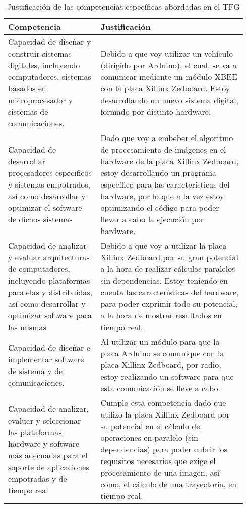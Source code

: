 \documentclass{pre-tfg}
\begin{document}


\begin{table}[hp]
  \centering
  \caption{Justificación de las competencias específicas abordadas en el TFG}
  \label{tab:competencias}

  \begin{tabular}{p{0.36\linewidth}p{0.58\linewidth}}
    \textbf{Competencia} & \textbf{Justificación} \\
    \hline
    Capacidad de diseñar y construir sistemas digitales, incluyendo computadores, sistemas basados en microprocesador y sistemas de comunicaciones. & Debido a que voy utilizar un vehículo (dirigido por Arduino), el cual, se va a comunicar mediante un módulo XBEE con la placa Xillinx Zedboard. Estoy desarrollando un nuevo sistema digital, formado por distinto hardware. \\
    Capacidad de desarrollar procesadores específicos y sistemas empotrados, así como desarrollar y optimizar el software de dichos sistemas & Dado que voy a embeber el algoritmo de procesamiento de imágenes en el hardware de la placa Xillinx Zedboard, estoy desarrollando un programa específico para las características del hardware, por lo que a la vez estoy optimizando el código para poder llevar a cabo la ejecución por hardware.\\
    Capacidad de analizar y evaluar arquitecturas de computadores, incluyendo plataformas paralelas y distribuidas, así como desarrollar y optimizar software para las mismas & Debido a que voy a utilizar la placa Xillinx Zedboard por su gran potencial a la hora de realizar cálculos paralelos sin dependencias. Estoy teniendo en cuenta las características del hardware, para poder exprimir todo su potencial, a la hora de mostrar resultados en tiempo real.\\
    Capacidad de diseñar e implementar software de sistema y de comunicaciones. & Al utilizar un módulo para que la placa Arduino se comunique con la placa Xillinx Zedboard, por radio, estoy realizando un software para que esta comunicación se lleve a cabo.\\
    Capacidad de analizar, evaluar y seleccionar las plataformas hardware y software más adecuadas para el soporte de aplicaciones empotradas y de tiempo real & Cumplo esta competencia dado que utilizo la placa Xillinx Zedboard por su potencial en el cálculo de operaciones en paralelo (sin dependencias) para poder cubrir los requisitos necesarios que exige el procesamiento de una imagen, así como, el cálculo de una trayectoria, en tiempo real.\\

\end{tabular}
\end{table}
\end{document}
